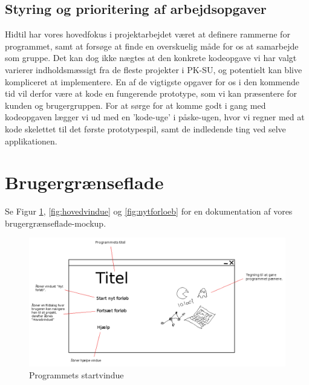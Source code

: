 \documentclass[10pt,a4paper,danish]{article}
\begin{document}
\subsection{Styring og prioritering af arbejdsopgaver}
Hidtil har vores hovedfokus i projektarbejdet været at definere rammerne for programmet, samt at forsøge at finde en overskuelig måde for os at samarbejde som gruppe. Det kan dog ikke nægtes at den konkrete kodeopgave vi har valgt varierer indholdsmæssigt fra de fleste projekter i PK-SU, og potentielt kan blive kompliceret at implementere. En af de vigtigste opgaver for os i den kommende tid vil derfor være at kode en fungerende prototype, som vi kan præsentere for kunden og brugergruppen. For at sørge for at komme godt i gang med kodeopgaven lægger vi ud med en 'kode-uge' i påske-ugen, hvor vi regner med at kode skelettet til det første prototypespil, samt de indledende ting ved selve applikationen. 

\section{Brugergrænseflade}
Se Figur \ref{fig:startvindue}, \ref{fig:hovedvindue} og  \ref{fig:nytforloeb} for en dokumentation af vores brugergrænseflade-mockup. 

\begin{figure}[h]
  \begin{center}
    \includegraphics[scale=0.4]{startvindue.png}
    \caption{Programmets startvindue}
    \label{fig:startvindue}
  \end{center}
\end{figure}
\newpage
\end{document}

